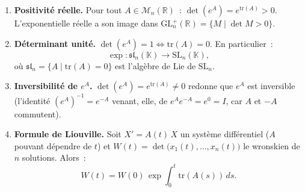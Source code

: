 \begin{tcolorbox}[thmbox]
  \begin{enumerate}
    \item \textbf{Positivité réelle.}\enspace%
          Pour tout $A \in \mathcal{M}_n(\mathbb{R})$~:
          $\det(e^A) = e^{\mathrm{tr}(A)} > 0$.
          L'exponentielle réelle a son image dans
          $\mathrm{GL}_n^+(\mathbb{R}) = \{M \mid \det M > 0\}$.

    \item \textbf{Déterminant unité.}\enspace{}
          $\det(e^A) = 1 \iff \mathrm{tr}(A) = 0$.
          En particulier~:
          \[
            \exp : \mathfrak{sl}_n(\mathbb{K}) \to \mathrm{SL}_n(\mathbb{K}),
          \]
          où $\mathfrak{sl}_n = \{A \mid \mathrm{tr}(A)=0\}$ est l'algèbre de
          Lie de $\mathrm{SL}_n$.

    \item \textbf{Inversibilité de $e^A$.}\enspace{}
          $\det(e^A) = e^{\mathrm{tr}(A)} \neq 0$ redonne que $e^A$ est
          inversible (l'identité ${(e^A)}^{-1} = e^{-A}$ venant, elle,
          de $e^A e^{-A} = e^0 = I$, car $A$ et $-A$ commutent).

    \item \textbf{Formule de Liouville.}\enspace%
          Soit $X' = A(t)\,X$ un système différentiel ($A$ pouvant dépendre de $t$)
          et $W(t) = \det\bigl(x_1(t),\ldots,x_n(t)\bigr)$ le wronskien
          de $n$ solutions. Alors~:
          \[
            W(t) = W(0)\,\exp\!\!\int_0^t \mathrm{tr}(A(s))\,ds.
          \]
  \end{enumerate}
\end{tcolorbox}


